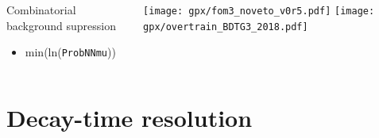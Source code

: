 \documentclass[aspectratio=169,9pt,handout]{beamer}
\newcommand{\pdfnote}[1]{}
\begin{document}
\begin{frame}[default]
\begin{columns}
\begin{column}{0.65\textwidth}
\begin{block}{Combinatorial background supression}
\begin{itemize}
\begin{multicols}{3}
\begin{itemize}
          \item min(ln({\tt ProbNNmu})) %
        \end{itemize}
        \end{multicols}
      \end{itemize}
    \end{block}
  \end{column}
  \begin{column}{0.3\textwidth}
    \texttt{[image: gpx/fom3\_noveto\_v0r5.pdf]}
    \texttt{[image: gpx/overtrain\_BDTG3\_2018.pdf]}
  \end{column}
\end{columns}

\pdfnote{After trigger and stripping selection a combinatorial backgorund supression is done with a combination of bdts and sWeights. }
\pdfnote{The BDT is used with MC as signal and the upper siedband as background}
\pdfnote{PIDcalib is used to correct identification of particles}
\pdfnote{MC is regweited to match sWeighted data}
\pdfnote{We avoid varaibles with impact on angular and decay time acepetnaces those that could introduce effect difficult to correct afterwards} 

\end{frame} %



\section{Decay-time resolution}
\end{document}
